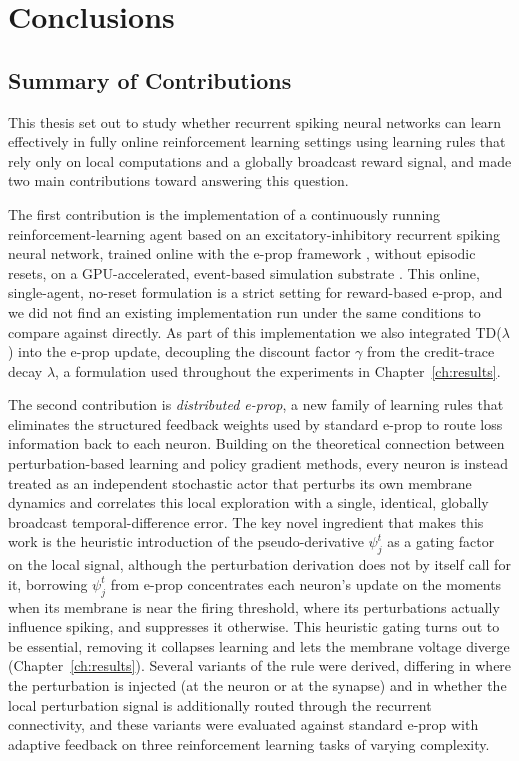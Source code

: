 \chapter{Conclusions}
\label{ch:conclusions}

\section{Summary of Contributions}
\label{sec:summary_contributions}

This thesis set out to study whether recurrent spiking neural networks can
learn effectively in fully online reinforcement learning settings using
learning rules that rely only on local computations and a globally
broadcast reward signal, and made two main contributions toward answering
this question.

The first contribution is the implementation of a continuously running reinforcement-learning agent
based on an excitatory-inhibitory recurrent spiking neural network, trained online with the e-prop
framework \citep{eprop2020}, without episodic resets, on a GPU-accelerated, event-based simulation
substrate \citep{Yavuz2016GeNN}. This online, single-agent, no-reset formulation is a strict setting
for reward-based e-prop, and we did not find an existing implementation run under the same
conditions to compare against directly. As part of this implementation we also integrated
TD($\lambda$) into the e-prop update, decoupling the discount factor $\gamma$ from the credit-trace
decay $\lambda$, a formulation used throughout the experiments in Chapter~\ref{ch:results}.

The second contribution is \emph{distributed e-prop}, a new family of learning rules that eliminates
the structured feedback weights used by standard e-prop to route loss information back to each
neuron. Building on the theoretical connection between perturbation-based learning and policy
gradient methods, every neuron is instead treated as an independent stochastic actor that perturbs
its own membrane dynamics and correlates this local exploration with a single, identical, globally
broadcast temporal-difference error. The key novel ingredient that makes this work is the heuristic
introduction of the pseudo-derivative $\psi^t_j$ as a gating factor on the local signal, although the
perturbation derivation does not by itself call for it, borrowing $\psi^t_j$ from e-prop concentrates
each neuron's update on the moments when its membrane is near the firing threshold, where its
perturbations actually influence spiking, and suppresses it otherwise. This heuristic gating turns
out to be essential, removing it collapses learning and lets the membrane
voltage diverge (Chapter~\ref{ch:results}). Several variants of the rule were derived,
differing in where the perturbation is injected (at the neuron or at the synapse) and in whether the
local perturbation signal is additionally routed through the recurrent connectivity, and these
variants were evaluated against standard e-prop with adaptive feedback on
three reinforcement learning tasks of varying complexity.

